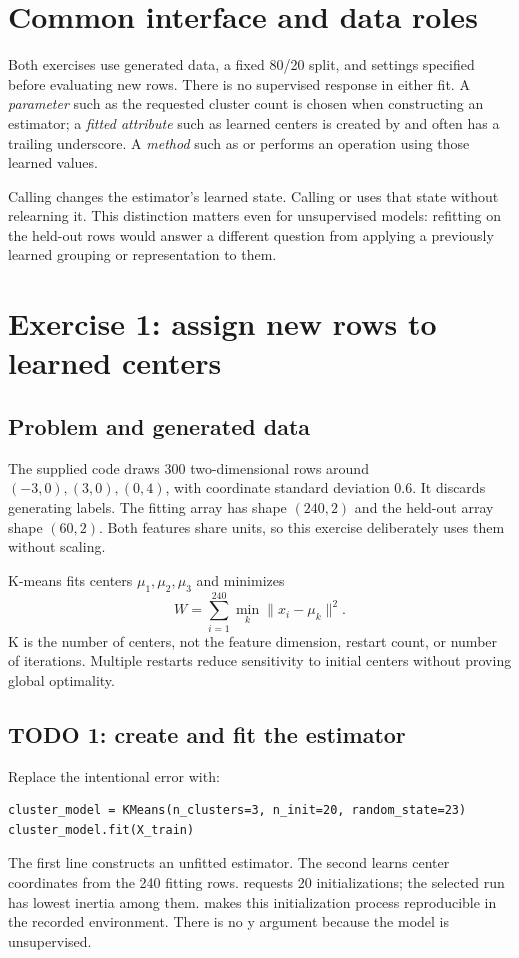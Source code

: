 

\section*{Common interface and data roles}
Both exercises use generated data, a fixed 80/20 split, and settings specified before evaluating new rows.
There is no supervised response in either fit. A \emph{parameter} such as the requested cluster count is chosen when constructing
an estimator; a \emph{fitted attribute} such as learned centers is created by  and often has a trailing underscore.
A \emph{method} such as  or  performs an operation using those learned values.

Calling  changes the estimator's learned state. Calling  or  uses that state without relearning it.
This distinction matters even for unsupervised models: refitting on the held-out rows would answer a different question from
applying a previously learned grouping or representation to them.

\section{Exercise 1: assign new rows to learned centers}
\subsection{Problem and generated data}
The supplied code draws 300 two-dimensional rows around $(-3,0),(3,0),(0,4)$, with coordinate standard deviation 0.6.
It discards generating labels. The fitting array has shape $(240,2)$ and the held-out array shape $(60,2)$.
Both features share units, so this exercise deliberately uses them without scaling.

K-means fits centers $\mu_1,\mu_2,\mu_3$ and minimizes
\[W=\sum_{i=1}^{240}\min_k\|x_i-\mu_k\|^2.\]
K is the number of centers, not the feature dimension, restart count, or number of iterations.
Multiple restarts reduce sensitivity to initial centers without proving global optimality.

\subsection{TODO 1: create and fit the estimator}
Replace the intentional error with:
\begin{lstlisting}
cluster_model = KMeans(n_clusters=3, n_init=20, random_state=23)
cluster_model.fit(X_train)
\end{lstlisting}
The first line constructs an unfitted estimator. The second learns center coordinates from the 240 fitting rows.
 requests 20 initializations; the selected run has lowest inertia among them.
 makes this initialization process reproducible in the recorded environment.
There is no y argument because the model is unsupervised.

